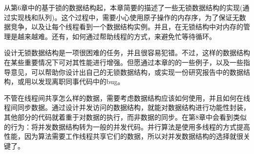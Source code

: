
从第6章中的基于锁的数据结构起，本章简要的描述了一些无锁数据结构的实现(通过实现栈和队列)。这个过程中，需要小心使用原子操作的内存序，为了保证无数据竞争，以及让每个线程看到一个数据结构实例。并且，在无锁结构中对内存的管理是越来越难。还有，如何通过帮助线程的方式，来避免忙等待循环。

设计无锁数据结构是一项很困难的任务，并且很容易犯错。不过，这样的数据结构在某些重要情况下可对其性能进行增强。但愿通过本章的的一些例子，以及一些指导意见，可以帮助你设计出自己的无锁数据结构，或实现一份研究报告中的数据结构，或用以发现离职同事代码中的bug。

不管在线程间共享怎么样的数据，需要考虑数据结构应该如何使用，并且如何在线程间同步数据。通过设计并发访问的数据结构，就能对数据结构进行功能性封装，其他部分的代码就着重于对数据的执行，而非数据的同步。在第8章中会看到类似的行为：将并发数据结构转为一般的并发代码。并行算法是使用多线程的方式提高性能，因为算法需要工作线程共享它们的数据，所以对并发数据结构的选择就很关键了。